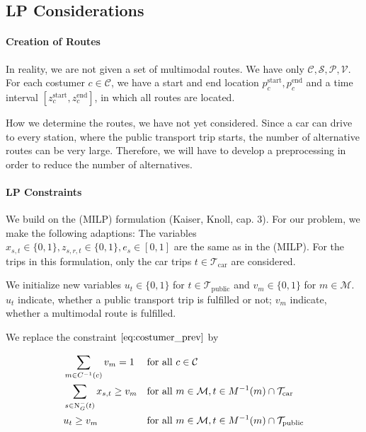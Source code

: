 
\subsection{LP Considerations}

\paragraph{Creation of Routes} \parfill

In reality, we are not given a set of multimodal routes. We have only $\mathcal{C}, \mathcal{S}, \mathcal{P}, \mathcal{V}$. For each costumer $c\in\mathcal{C}$, we have a start and end location $p_c^{\operatorname{start}}, p_c^{\operatorname{end}}$ and a time interval $\left[z_c^{\operatorname{start}},z_c^{\operatorname{end}}\right]$, in which all routes are located.

How we determine the routes, we have not yet considered. Since a car can drive to every station, where the public transport trip starts, the number of alternative routes can be very large. Therefore, we will have to develop a preprocessing in order to reduce the number of alternatives.

\paragraph{LP Constraints} \parfill

We build on the (MILP) formulation (Kaiser, Knoll, cap. 3). For our problem, we make the following adaptions: The variables $x_{s,t}\in \{0,1\}, z_{s,r,t}\in \{0,1\}, e_s \in[0,1]$ are the same as in the (MILP). For the trips in this formulation, only the car trips $t\in\mathcal{T}_{\operatorname{car}}$ are considered.

We initialize new variables $u_t \in\{0,1\}$ for $t\in\mathcal{T}_{\operatorname{public}}$ and $v_m \in\{0,1\}$ for $m\in\mathcal{M}$. $u_t$ indicate, whether a public transport trip is fulfilled or not; $v_m$ indicate, whether a multimodal route is fulfilled. 

We replace the constraint $\eqref{eq:costumer_prev}$ by

\begin{align}
	& \sum_{m\in C^{-1}(c)} v_m = 1 & & \text{for all } c\in\mathcal{C} \label{eq:costumer_new} \\
	& \sum_{s\in\operatorname{N}_G^-(t)} x_{s,t} \geq v_m & & \text{for all } m\in\mathcal{M}, t\in M^{-1}(m)\cap\mathcal{T}_{\operatorname{car}} \label{eq:route_car} \\
	& u_t \geq v_m & & \text{for all } m\in\mathcal{M}, t\in M^{-1}(m)\cap\mathcal{T}_{\operatorname{public}} \label{eq:route_public}
\end{align}

